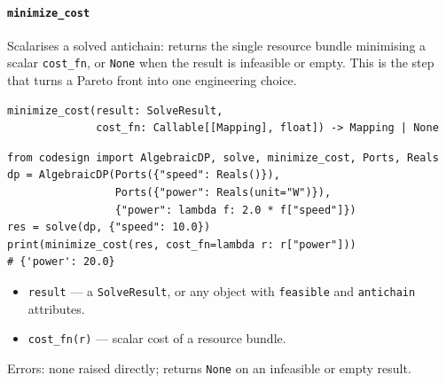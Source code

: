 \documentclass[11pt,a4paper]{article}
\begin{document}
\paragraph{\texttt{minimize\_cost}}
\label{ref:solver:minimize_cost}
Scalarises a solved antichain: returns the single resource bundle
minimising a scalar \texttt{cost\_fn}, or \texttt{None} when the result
is infeasible or empty. This is the step that turns a Pareto front into
one engineering choice.
\begin{lstlisting}
minimize_cost(result: SolveResult,
              cost_fn: Callable[[Mapping], float]) -> Mapping | None
\end{lstlisting}
\begin{lstlisting}
from codesign import AlgebraicDP, solve, minimize_cost, Ports, Reals
dp = AlgebraicDP(Ports({"speed": Reals()}),
                 Ports({"power": Reals(unit="W")}),
                 {"power": lambda f: 2.0 * f["speed"]})
res = solve(dp, {"speed": 10.0})
print(minimize_cost(res, cost_fn=lambda r: r["power"]))
# {'power': 20.0}
\end{lstlisting}
\begin{itemize}[nosep]
  \item \texttt{result} --- a \texttt{SolveResult}, or any object with
        \texttt{feasible} and \texttt{antichain} attributes.
  \item \texttt{cost\_fn(r)} --- scalar cost of a resource bundle.
\end{itemize}
Errors: none raised directly; returns \texttt{None} on an infeasible or
empty result.
\end{document}
